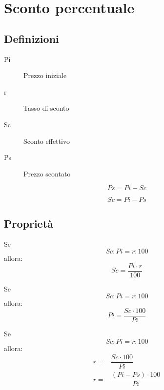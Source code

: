 \chapter{Sconto percentuale}
\section{Definizioni}
\begin{defn}[Vocabolario]
\begin{description}
	\item[Pi] Prezzo iniziale
	\item[r] Tasso di sconto
	\item[Sc] Sconto effettivo
	\item[Ps] Prezzo scontato
\end{description}
\end{defn}
\begin{defn}
	\begin{equation*}
	Ps=Pi-Sc
	\end{equation*}
\end{defn}
\begin{defn}
\begin{equation*}
Sc=Pi-Ps
\end{equation*}
\end{defn}
\section{Proprietà}
\begin{thm}
	Se \[Sc:Pi=r:100\] allora:
\begin{equation*}
Sc=\dfrac{Pi\cdot r}{100}
\end{equation*}
\end{thm}
\begin{thm}
	Se \[Sc:Pi=r:100\] allora:
\begin{equation*}
Pi=\dfrac{Sc\cdot 100}{Pi}
\end{equation*}
\end{thm}
\begin{thm}
	Se \[Sc:Pi=r:100\] allora:
\begin{align*}
r=&\dfrac{Sc\cdot 100}{Pi}\\
r=&\dfrac{(Pi-Ps)\cdot 100}{Pi}
\end{align*}
\end{thm}